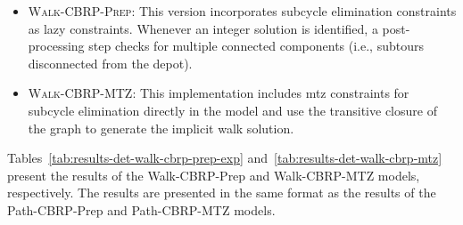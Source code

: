 \begin{itemize}
	\item \textsc{Walk-CBRP-Prep}: This version incorporates subcycle elimination constraints as lazy constraints. Whenever an integer solution is identified, a post-processing step checks for multiple connected components (i.e., subtours disconnected from the depot).
	\item \textsc{Walk-CBRP-MTZ}: This implementation includes \gls{mtz} constraints for subcycle elimination directly in the model and use the transitive closure of the graph to generate the implicit walk solution.
\end{itemize}

Tables~\ref{tab:results-det-walk-cbrp-prep-exp} and~\ref{tab:results-det-walk-cbrp-mtz} present the results of the Walk-CBRP-Prep and Walk-CBRP-MTZ models, respectively. The results are presented in the same format as the results of the Path-CBRP-Prep and Path-CBRP-MTZ models.

